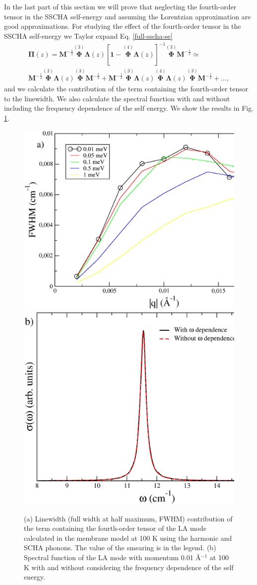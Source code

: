 In the last part of this section we will prove that neglecting the fourth-order tensor in the SSCHA self-energy and 
assuming the Lorentzian approximation are good approximations. For studying the effect of the fourth-order tensor 
in the SSCHA self-energy we Taylor expand Eq. \ref{full-sscha-se}
\begin{multline}
 \boldsymbol{\Pi}(z)=\mathbf{M}^{-\frac{1}{2}}\overset{(3)}{\mathbf{\Phi}}\mathbf{\Lambda}(z)[\mathbf{1}-\overset{(4)}{\mathbf{\Phi}}\mathbf{\Lambda}(z)]^{-1}
 \overset{(3)}{\mathbf{\Phi}}\mathbf{M}^{-\frac{1}{2}}\simeq\\\mathbf{M}^{-\frac{1}{2}}\overset{(3)}{\mathbf{\Phi}}\mathbf{\Lambda}(z)\overset{(3)}{\mathbf{\Phi}}\mathbf{M}^{-\frac{1}{2}}+\mathbf{M}^{-\frac{1}{2}}\overset{(3)}{\mathbf{\Phi}}\mathbf{\Lambda}(z)\overset{(4)}{\mathbf{\Phi}}\mathbf{\Lambda}(z)\overset{(3)}{\mathbf{\Phi}}\mathbf{M}^{-\frac{1}{2}}+\dots,
\end{multline}
and we calculate the contribution of the term containing the fourth-order tensor to the linewidth. We also calculate 
the spectral function with and without including the frequency dependence of the self energy. We show the results in 
Fig. \ref{lw_membrane}.
\begin{figure}[ht]
\includegraphics[width=0.49\linewidth]{Figures/v4-membrane.eps}
\includegraphics[width=0.45\linewidth]{Figures/spf-lorentzian-membrane.eps}
	\caption[Fourth-order term contribution to the linewidth in graphene. Spectral function within the 
	Lorentzian and non-Lorentzian approximations]{(a) Linewidth (full width at half maximum, FWHM) contribution 
	of the term containing the fourth-order tensor of the LA mode calculated in the membrane model at 100 K using 
	the harmonic and SCHA phonons. The value of the smearing is in the legend. (b) Spectral function of the LA 
	mode with momentum 0.01 \AA$^{-1}$ at 100 K with and without considering the frequency dependence of the 
	self energy.}
\label{lw_membrane}
\end{figure}
